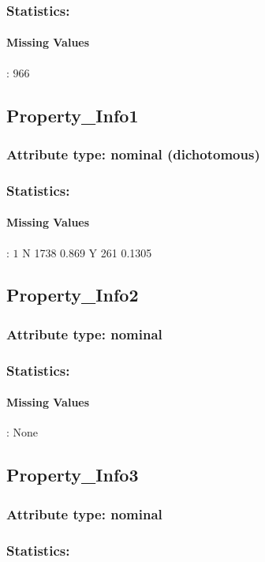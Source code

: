 \subsubsection{Statistics: }
\paragraph{Missing Values}: $966$

\subsection{Property\_Info1}
\subsubsection{Attribute type: nominal (dichotomous)}
\subsubsection{Statistics: }
\paragraph{Missing Values}: $1$
N	1738	0.869
Y	261	0.1305

\subsection{Property\_Info2}
\subsubsection{Attribute type: nominal}
\subsubsection{Statistics: }
\paragraph{Missing Values}: None

\subsection{Property\_Info3}
\subsubsection{Attribute type: nominal}
\subsubsection{Statistics: }
